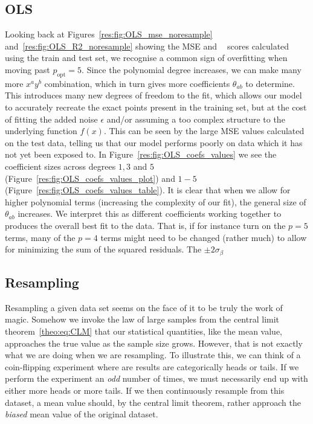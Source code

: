 \documentclass[twocolumn,english,notitlepage]{article}
\DeclareMathOperator{\Rsquared}{R^2}
\newcommand{\msub}[2]{\ensuremath{{#1}_\text{#2}}}
\begin{document}
    \subsection{OLS}
        Looking back at Figures~\ref{res:fig:OLS_mse_noresample} and~\ref{res:fig:OLS_R2_noresample} showing the MSE and $\Rsquared$ scores calculated using the train and test set, we recognise a common sign of overfitting when moving past $\msub{p}{opt} = 5$. Since the polynomial degree increases, we can make many more $x^ay^b$ combination, which in turn gives more coefficients $\theta_{ab}$ to determine. This introduces many new degrees of freedom to the fit, which allows our model to accurately recreate the exact points present in the training set, but at the cost of fitting the added noise $\epsilon$ and/or assuming a too complex structure to the underlying function $f(x)$. This can be seen by the large MSE values calculated on the test data, telling us that our model performs poorly on data which it has not yet been exposed to. In Figure~\ref{res:fig:OLS_coefs_values} we see the coefficient sizes across degrees $1,3$ and $5$ (Figure~\ref{res:fig:OLS_coefs_values_plot}) and $1-5$ (Figure~\ref{res:fig:OLS_coefs_values_table}). It is clear that when we allow for higher polynomial terms (increasing the complexity of our fit), the general size of $\theta_{ab}$ increases. We interpret this as different coefficients working together to produces the overall best fit to the data. That is, if for instance turn on the $p=5$ terms, many of the $p=4$ terms might need to be changed (rather much) to allow for minimizing the sum of the squared residuals. The $\pm 2\sigma_{\beta}$      

    \subsection{Resampling}
        Resampling a given data set seems on the face of it to be truly the work of magic. Somehow we invoke the law of large samples from the central limit theorem~\eqref{theo:eq:CLM} that our statistical quantities, like the mean value, approaches the true value as the sample size grows. However, that is not exactly what we are doing when we are resampling. To illustrate this, we can think of a coin-flipping experiment where are results are categorically heads or tails. If we perform the experiment an \textit{odd} number of times, we must necessarily end up with either more heads or more tails. If we then continuously resample from this dataset, a mean value should, by the central limit theorem, rather approach the \textit{biased} mean value of the original dataset.
\end{document}
